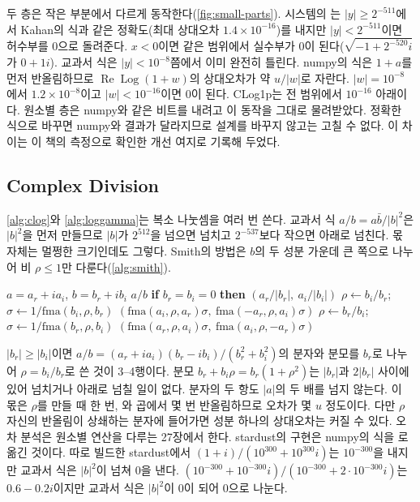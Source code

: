 두 층은 작은 부분에서 다르게 동작한다(\cref{fig:small-parts}). 시스템의 는 $|y|\ge2^{-511}$에서 Kahan의 식과 같은 정확도(최대 상대오차 $1.4\times10^{-16}$)를 내지만 $|y|<2^{-511}$이면 허수부를 $0$으로 돌려준다. $x<0$이면 같은 범위에서 실수부가 $0$이 된다($\sqrt{-1+2^{-520}i}$가 $0+1i$). 교과서 식은 $|y|<10^{-8}$쯤에서 이미 완전히 틀린다. numpy의  식은 $1+a$를 먼저 반올림하므로 $\operatorname{Re}\operatorname{Log}(1+w)$의 상대오차가 약 $u/|w|$로 자란다. $|w|=10^{-8}$에서 $1.2\times10^{-8}$이고 $|w|<10^{-16}$이면 $0$이 된다. \textrm{CLog1p}는 전 범위에서 $10^{-16}$ 아래이다. 원소별 층은 numpy와 같은 비트를 내려고 이 동작을 그대로 물려받았다. 정확한 식으로 바꾸면 numpy와 결과가 달라지므로 설계를 바꾸지 않고는 고칠 수 없다. 이 차이는 이 책의 측정으로 확인한 개선 여지로 기록해 두었다.

\subsection{Complex Division}
\label{sec:smith}

\cref{alg:clog}와 \cref{alg:loggamma}는 복소 나눗셈을 여러 번 쓴다. 교과서 식 $a/b=a\bar b/|b|^2$은 $|b|^2$을 먼저 만들므로 $|b|$가 $2^{512}$을 넘으면 넘치고 $2^{-537}$보다 작으면 아래로 넘친다. 몫 자체는 멀쩡한 크기인데도 그렇다. Smith의 방법은 $b$의 두 성분 가운데 큰 쪽으로 나누어 비 $\rho\le1$만 다룬다(\cref{alg:smith}).

\begin{algorithm}[htbp]
\begin{algorithmic}[1]
\Require $a=a_r+ia_i$, $b=b_r+ib_i$
\Ensure $a/b$
  \State \textbf{if} $b_r=b_i=0$ \textbf{then} \Return $(a_r/|b_r|,\ a_i/|b_i|)$ 
  \State $\rho\gets b_i/b_r$; $\sigma\gets1/\mathrm{fma}(b_i,\rho,b_r)$ 
  \State \Return $(\mathrm{fma}(a_i,\rho,a_r)\sigma,\ \mathrm{fma}(-a_r,\rho,a_i)\sigma)$
\EndIf
\State $\rho\gets b_r/b_i$; $\sigma\gets1/\mathrm{fma}(b_r,\rho,b_i)$
\State \Return $(\mathrm{fma}(a_r,\rho,a_i)\sigma,\ \mathrm{fma}(a_i,\rho,-a_r)\sigma)$
\end{algorithmic}
\caption{Smith의 복소 나눗셈 (stardust 의 )}
\label{alg:smith}
\end{algorithm}

$|b_r|\ge|b_i|$이면 $a/b=(a_r+ia_i)(b_r-ib_i)/(b_r^2+b_i^2)$의 분자와 분모를 $b_r$로 나누어 $\rho=b_i/b_r$로 쓴 것이 3--4행이다. 분모 $b_r+b_i\rho=b_r(1+\rho^2)$는 $|b_r|$과 $2|b_r|$ 사이에 있어 넘치거나 아래로 넘칠 일이 없다. 분자의 두 항도 $|a|$의 두 배를 넘지 않는다. 이 몫은 $\rho$를 만들 때 한 번, 와 곱에서 몇 번 반올림하므로 오차가 몇 $u$ 정도이다. 다만 $\rho$ 자신의 반올림이 상쇄하는 분자에 들어가면 성분 하나의 상대오차는 커질 수 있다. 오차 분석은 원소별 연산을 다루는 27장에서 한다. stardust의 구현은 numpy의 식을 로 옮긴 것이다. 따로 빌드한 stardust에서 $(1+i)/(10^{300}+10^{300}i)$는 $10^{-300}$을 내지만 교과서 식은 $|b|^2$이 넘쳐 $0$을 낸다. $(10^{-300}+10^{-300}i)/(10^{-300}+2\cdot10^{-300}i)$는 $0.6-0.2i$이지만 교과서 식은 $|b|^2$이 $0$이 되어 $0$으로 나눈다.

